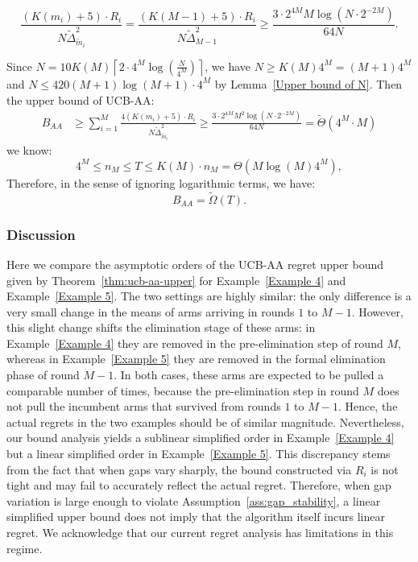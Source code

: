 \documentclass[11pt]{article}
\begin{document}
$$ \frac{(K(m_i)+5)\cdot R_i}{N\tilde{\Delta}_{\tilde{m}_i}^2} = \frac{(K(M-1)+5)\cdot R_i}{N\tilde{\Delta}_{M-1}^{2}}\ge \frac{3\cdot 2^{4M}M\log (N \cdot 2^{-2M})}{64N} .$$

Since $N=10 K(M) \left\lceil 2\cdot 4^M\log\left(\frac{N}{4^M}\right) \right\rceil$, we have $N \geq K(M)4^M =(M+1)4^M$ and $N\leq420(M+1)\log(M+1)\cdot 4^M $ by Lemma~\ref{Upper bound of N}. Then the upper bound of UCB-AA:
$$\begin{aligned}
B_{AA} &\ge  \sum_{i=1}^{M}  \frac{4\left(K(m_i)+5\right)\cdot R_i}{N\tilde{\Delta}_{\tilde{m}_i}^2}\ge \frac{3\cdot 2^{4M}M^2\log (N \cdot 2^{-2M})}{64N} = \tilde{\Theta} \left( 4^M \cdot M \right)
\end{aligned}$$
we know: 
\[4^M \leq n_M\leq T\leq K(M)\cdot n_M = \Theta(M\log(M)4^M), \]
Therefore, in the sense of ignoring logarithmic terms, we have:
$$B_{AA} =\tilde{\Omega}(T). $$

\subsubsection*{Discussion}
Here we compare the asymptotic orders of the UCB-AA regret upper bound given by Theorem~\ref{thm:ucb-aa-upper} for Example~\ref{Example 4} and Example~\ref{Example 5}. The two settings are highly similar: the only difference is a very small change in the means of arms arriving in rounds $1$ to $M-1$. However, this slight change shifts the elimination stage of these arms: in Example~\ref{Example 4} they are removed in the pre-elimination step of round $M$, whereas in Example~\ref{Example 5} they are removed in the formal elimination phase of round $M-1$. In both cases, these arms are expected to be pulled a comparable number of times, because the pre-elimination step in round $M$ does not pull the incumbent arms that survived from rounds $1$ to $M-1$. Hence, the actual regrets in the two examples should be of similar magnitude. Nevertheless, our bound analysis yields a sublinear simplified order in Example~\ref{Example 4} but a linear simplified order in Example~\ref{Example 5}. This discrepancy stems from the fact that when gaps vary sharply, the bound constructed via $R_i$ is not tight and may fail to accurately reflect the actual regret. Therefore, when gap variation is large enough to violate Assumption~\ref{ass:gap_stability}, a linear simplified upper bound does not imply that the algorithm itself incurs linear regret. We acknowledge that our current regret analysis has limitations in this regime.
\end{document}
